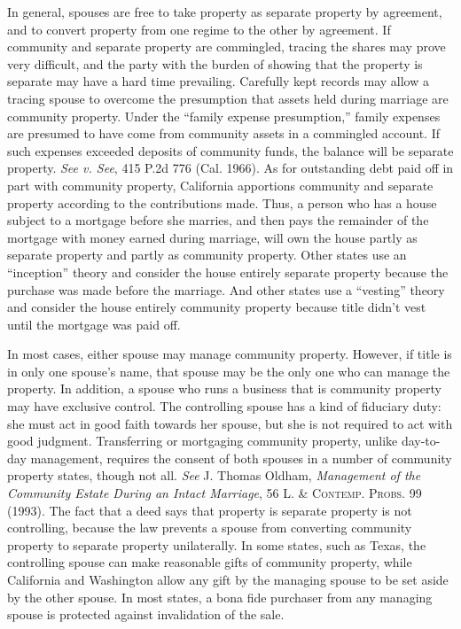 In general, spouses are free to take property as separate property by agreement,
and to convert property from one regime to the other by agreement. If
community and separate property are commingled, tracing the shares may prove
very difficult, and the party with the burden of showing that the property is
separate may have a hard time prevailing. Carefully kept records may allow a
tracing spouse to overcome the presumption that assets held during marriage are
community property. Under the ``family expense presumption,'' family expenses
are presumed to have come from community assets in a commingled account. If
such expenses exceeded deposits of community funds, the balance will be
separate property. \emph{See v. See}, 415 P.2d 776 (Cal. 1966). As for
outstanding debt paid off in part with community property, California apportions
community and separate property according to the contributions made. Thus, a
person who has a house subject to a mortgage before she marries, and then pays
the remainder of the mortgage with money earned during marriage, will own the
house partly as separate property and partly as community property. Other states
use an ``inception'' theory and consider the house entirely separate property
because the purchase was made before the marriage. And other states use a
``vesting'' theory and consider the house entirely community property because
title didn't vest until the mortgage was paid off.

In most cases, either spouse may manage community property. However, if title
is in only one spouse's name, that spouse may be the only one who can manage
the property. In addition, a spouse who runs a business that is community
property may have exclusive control. The controlling spouse has a kind of
fiduciary duty: she must act in good faith towards her spouse, but she is not
required to act with good judgment. Transferring or mortgaging community
property, unlike day-to-day management, requires the consent of both spouses in
a number of community property states, though not all. \textit{See} J. Thomas
Oldham, \textit{Management of the Community Estate During an Intact Marriage},
56 \textsc{L. \& Contemp. Probs.} 99 (1993). The fact that a deed says that
property is separate property is not controlling, because the law prevents a
spouse from converting community property to separate property unilaterally.
In some states, such as Texas, the controlling spouse can make reasonable gifts
of community property, while California and Washington allow any gift by the
managing spouse to be set aside by the other spouse. In most states, a bona
fide purchaser from any managing spouse is protected against invalidation of
the sale.

